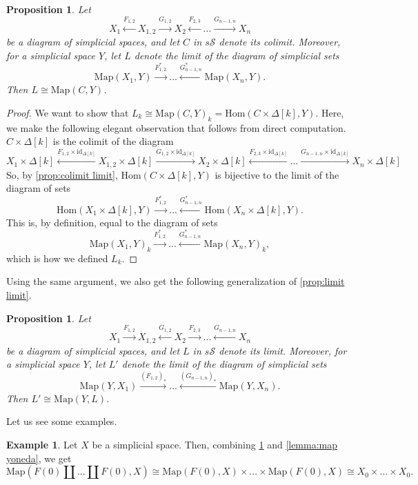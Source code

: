 \documentclass[11pt, a4paper]{amsart}
\newcommand{\Hom}{\mathrm{Hom}}
\newcommand{\Map}{\mathrm{Map}}
\newcommand{\sSp}{s\mathscr{S}}
\newcommand{\id}{\mathrm{id}}
\newtheorem{proposition}[equation]{Proposition}
\theoremstyle{definition}
\newtheorem{example}[equation]{Example}
\theoremstyle{remark}
\numberwithin{equation}{section}
\begin{document}
\begin{proposition} \label{prop:colimit limit map}
  Let 
  \[X_1 \xleftarrow{F_{1,2}} X_{1,2} \xrightarrow{G_{1,2}} X_{2} \xleftarrow{F_{2,3}} ... \xrightarrow{G_{n-1,n}} X_n\] 
  be a diagram of simplicial spaces, and let $C$ in $\sSp$ denote its colimit. Moreover, for a simplicial space $Y$, let $L$ denote the limit of the diagram of simplicial sets 
  \[\Map(X_1,Y) \xrightarrow{F_{1,2}^*} ... \xleftarrow{G_{n-1,n}^*} \Map(X_n,Y).\] 
  Then $L \cong \Map(C,Y)$.
\end{proposition}

\begin{proof}
  We want to show that $L_k \cong \Map(C,Y)_k = \Hom(C \times \Delta[k],Y)$. Here, we make the following elegant observation that follows from direct computation. $C \times \Delta[k]$ is the colimit of the diagram 
  \[X_1 \times \Delta[k] \xleftarrow{F_{1,2} \times \id_{\Delta[k]}} X_{1,2} \times \Delta[k] \xrightarrow{G_{1,2} \times \id_{\Delta[k]}} X_{2} \times \Delta[k] \xleftarrow{F_{2,3} \times \id_{\Delta[k]}} ... \xrightarrow{G_{n-1,n} \times \id_{\Delta[k]}} X_n \times \Delta[k]\] 
  So, by \cref{prop:colimit limit},
  $\Hom(C \times \Delta[k],Y)$ is bijective to the limit of the diagram of sets
  \[\Hom(X_1 \times \Delta[k],Y) \xrightarrow{F_{1,2}^*} ... \xleftarrow{G_{n-1,n}^*} \Hom(X_n \times \Delta[k],Y).\]
  This is, by definition, equal to the diagram of sets
  \[\Map(X_1,Y)_k \xrightarrow{F_{1,2}^*} ... \xleftarrow{G_{n-1,n}^*} \Map(X_n,Y)_k,\]
  which is how we defined $L_k$.
\end{proof}

Using the same argument, we also get the following generalization of \cref{prop:limit limit}.
\begin{proposition} \label{prop:limit limit map}
 Let 
  \[X_1 \xrightarrow{F_{1,2}} X_{1,2} \xleftarrow{G_{1,2}} X_{2} \xrightarrow{F_{2,3}} ... \xleftarrow{G_{n-1,n}} X_n\] 
  be a diagram of simplicial spaces, and let $L$ in $\sSp$ denote its limit. Moreover, for a simplicial space $Y$, let $L'$ denote the limit of the diagram of simplicial sets 
  \[\Map(Y,X_1) \xrightarrow{(F_{1,2})_*} ... \xleftarrow{(G_{n-1,n})_*} \Map(Y,X_n).\] 
  Then $L' \cong \Map(Y,L)$.
\end{proposition}

Let us see some examples.

\begin{example} \label{ex:map coproduct}
  Let $X$ be a simplicial space. Then, combining \cref{prop:colimit limit map} and \cref{lemma:map yoneda}, we get 
  \[\Map(F(0) \coprod ... \coprod F(0),X) \cong \Map(F(0),X) \times ... \times \Map(F(0),X) \cong X_0 \times ... \times X_0.\]
\end{example}
\end{document}
